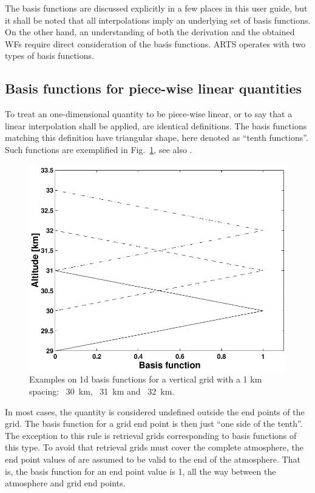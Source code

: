 The basis functions are discussed explicitly in a few places in this user
guide, but it shall be noted that all interpolations imply an underlying set
of basis functions. On the other hand, an understanding of both the derivation
and the obtained WFs require direct consideration of the basis functions. ARTS
operates with two types of basis functions.




\subsection{Basis functions for piece-wise linear quantities}
\label{sec:wfuns:basis1}
%
To treat an one-dimensional quantity to be piece-wise linear, or to say that a
linear interpolation shall be applied, are identical definitions. The basis
functions matching this definition have triangular shape, here denoted as
``tenth functions''. Such functions are exemplified in
Fig.~\ref{fig:wfuns:zbasis}, see also \citet{buehler:artst:05}. 

\begin{figure}[t]
 \begin{center}
  \includegraphics*[width=0.7\hsize]{fig_absbasis_z}
  \caption{Examples on 1d basis functions for a vertical grid with a 1 km
           spacing: \lsolid~30~km, \ldashed~31~km and \ldashdot~32~km.}
  \label{fig:wfuns:zbasis}  
 \end{center}
\end{figure}

In most cases, the quantity is considered undefined outside the end points of
the grid. The basis function for a grid end point is then just ``one side of
the tenth''. The exception to this rule is retrieval grids corresponding to
basis functions of this type. To avoid that retrieval grids must cover the
complete atmosphere, the end point values of are assumed to be valid to the end
of the atmosphere. That is, the basis function for an end point value is 1, all
the way between the atmosphere and grid end points.

